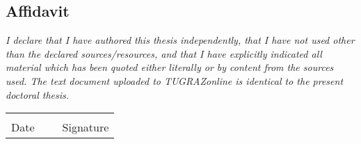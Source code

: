 \cleardoublepage

\thispagestyle{empty}

\vspace*{2cm}

\subsection*{Affidavit}
\noindent
\textit{%
	I declare that I have authored this thesis independently, that I have not used other than the declared sources/resources, and that I have explicitly indicated all material which has been quoted either literally or by content from the sources used.
	The text document uploaded to TUGRAZonline is identical to the present doctoral thesis.
}

\vspace*{1cm}

\begin{flushleft}
	\begin{tabular}{ccc}
		\underline{\hspace*{4.2cm}} & \hspace*{2cm} &  \underline{\hspace*{4.2cm}} \\
		Date  & ~ &  Signature \\
	\end{tabular}
\end{flushleft}
\vspace*{2cm}
